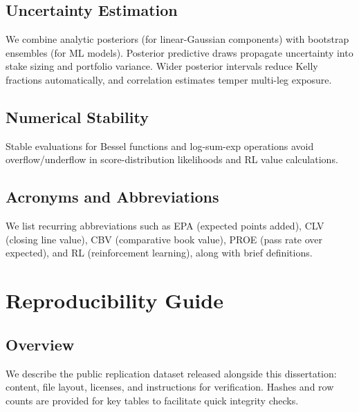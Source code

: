 \section{Uncertainty Estimation}\label{app:uncertainty}
We combine analytic posteriors (for linear-Gaussian components) with bootstrap ensembles (for ML models). Posterior predictive draws propagate uncertainty into stake sizing and portfolio variance. Wider posterior intervals reduce Kelly fractions automatically, and correlation estimates temper multi-leg exposure.

\section{Numerical Stability}\label{app:numerical}
Stable evaluations for Bessel functions and log-sum-exp operations avoid overflow/underflow in score-distribution likelihoods and RL value calculations.

\section{Acronyms and Abbreviations}\label{app:acronyms}
We list recurring abbreviations such as EPA (expected points added), CLV (closing line value), CBV (comparative book value), PROE (pass rate over expected), and RL (reinforcement learning), along with brief definitions.

\chapter{Reproducibility Guide}\label{app:reproducibility}


\section{Overview}\label{app:repro-overview}
We describe the public replication dataset released alongside this dissertation: content, file layout, licenses, and instructions for verification. Hashes and row counts are provided for key tables to facilitate quick integrity checks.


